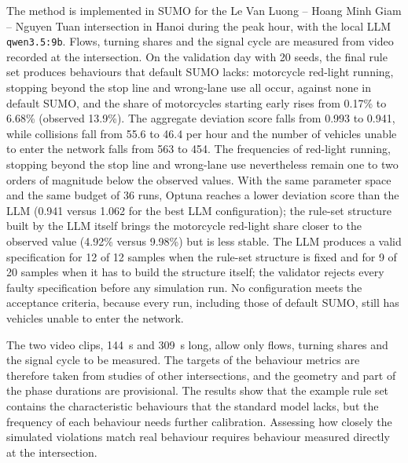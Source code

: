 \documentclass[../main.tex]{subfiles}
\begin{document}
The method is implemented in SUMO for the Le Van Luong -- Hoang Minh Giam -- Nguyen Tuan intersection in Hanoi during the peak hour, with the local LLM \texttt{qwen3.5:9b}. Flows, turning shares and the signal cycle are measured from video recorded at the intersection. On the validation day with 20 seeds, the final rule set produces behaviours that default SUMO lacks: motorcycle red-light running, stopping beyond the stop line and wrong-lane use all occur, against none in default SUMO, and the share of motorcycles starting early rises from 0.17\% to 6.68\% (observed 13.9\%). The aggregate deviation score falls from 0.993 to 0.941, while collisions fall from 55.6 to 46.4 per hour and the number of vehicles unable to enter the network falls from 563 to 454. The frequencies of red-light running, stopping beyond the stop line and wrong-lane use nevertheless remain one to two orders of magnitude below the observed values. With the same parameter space and the same budget of 36 runs, Optuna reaches a lower deviation score than the LLM (0.941 versus 1.062 for the best LLM configuration); the rule-set structure built by the LLM itself brings the motorcycle red-light share closer to the observed value (4.92\% versus 9.98\%) but is less stable. The LLM produces a valid specification for 12 of 12 samples when the rule-set structure is fixed and for 9 of 20 samples when it has to build the structure itself; the validator rejects every faulty specification before any simulation run. No configuration meets the acceptance criteria, because every run, including those of default SUMO, still has vehicles unable to enter the network.

The two video clips, 144~s and 309~s long, allow only flows, turning shares and the signal cycle to be measured. The targets of the behaviour metrics are therefore taken from studies of other intersections, and the geometry and part of the phase durations are provisional. The results show that the example rule set contains the characteristic behaviours that the standard model lacks, but the frequency of each behaviour needs further calibration. Assessing how closely the simulated violations match real behaviour requires behaviour measured directly at the intersection.
\end{document}
